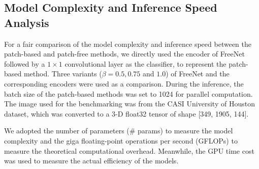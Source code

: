 \documentclass[journal]{IEEEtran}
\begin{document}
\subsection{\textbf{Model Complexity and Inference Speed Analysis}}
For a fair comparison of the model complexity and inference speed between the patch-based and patch-free methods, we directly used the encoder of FreeNet followed by a $1\times 1$ convolutional layer as the classifier, to represent the patch-based method.
Three variants ($\beta=0.5, 0.75$ and $1.0$) of FreeNet and the corresponding encoders were used as a comparison.
During the inference, the batch size of the patch-based methods was set to 1024 for parallel computation.
The image used for the benchmarking was from the CASI University of Houston dataset, which was converted to a 3-D float32 tensor of shape [349, 1905, 144].

We adopted the number of parameters (\# params) to measure the model complexity and the giga floating-point operations per second (GFLOPs) to measure the theoretical computational overhead.
Meanwhile, the GPU time cost was used to measure the actual efficiency of the models.
\end{document}

